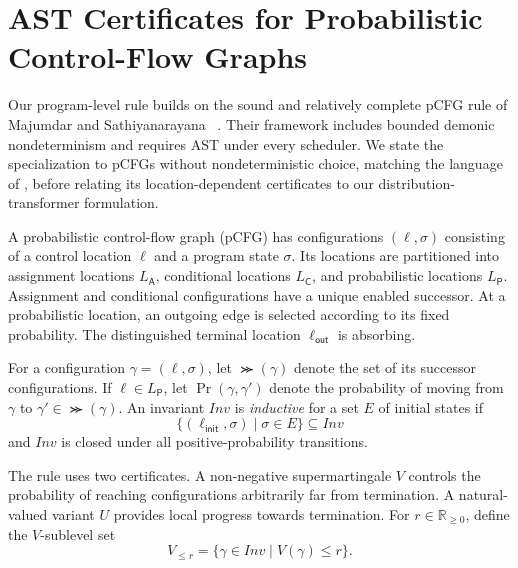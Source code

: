 \section{AST Certificates for Probabilistic Control-Flow Graphs}
\label{sec:background}

Our program-level rule builds on the sound and relatively complete
pCFG rule of Majumdar and Sathiyanarayana%
~\cite{DBLP:journals/pacmpl/MajumdarS25}. Their framework includes
bounded demonic nondeterminism and requires AST under every scheduler.
We state the specialization to pCFGs without nondeterministic choice,
matching the language of , before relating its
location-dependent certificates to our distribution-transformer
formulation.

A probabilistic control-flow graph (pCFG) has configurations
$(\ell,\sigma)$ consisting of a control location $\ell$ and a program
state $\sigma$. Its locations are partitioned into assignment locations
$L_{\mathsf A}$, conditional locations $L_{\mathsf C}$, and
probabilistic locations $L_{\mathsf P}$. Assignment and conditional
configurations have a unique enabled successor. At a probabilistic
location, an outgoing edge is selected according to its fixed
probability. The distinguished terminal location
$\ell_{\mathsf{out}}$ is absorbing.

For a configuration $\gamma=(\ell,\sigma)$, let
$\Succ(\gamma)$ denote the set of its successor configurations. If
$\ell\in L_{\mathsf P}$, let
$\Pr(\gamma,\gamma')$ denote the probability of moving from $\gamma$
to $\gamma'\in\Succ(\gamma)$. An invariant
$\mathit{Inv}$ is \emph{inductive} for a set $E$ of initial states if
\[
 \{(\ell_{\mathsf{init}},\sigma)\mid \sigma\in E\}
 \subseteq \mathit{Inv}
\]
and $\mathit{Inv}$ is closed under all positive-probability
transitions.

The rule uses two certificates. A non-negative supermartingale $V$
controls the probability of reaching configurations arbitrarily far
from termination. A natural-valued variant $U$ provides local
progress towards termination. For $r\in\mathbb{R}_{\geq 0}$, define
the $V$-sublevel set
\[
 V_{\leq r}
 =
 \bigl\{\gamma\in\mathit{Inv}\mid V(\gamma)\leq r\bigr\}.
\]

